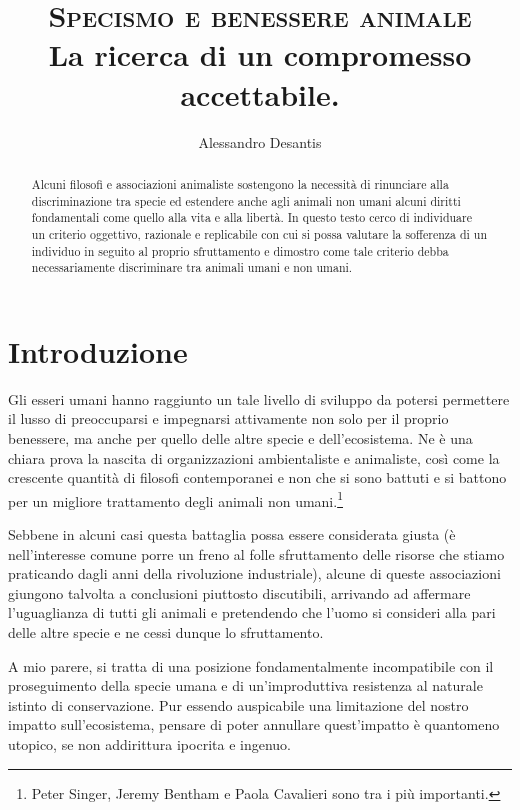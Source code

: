 \documentclass[a4paper,11pt,oneside,article]{memoir}
\title{\textsc{Specismo e benessere animale} \\ \vspace{1mm} \small{La ricerca di un compromesso accettabile.}}
\author{Alessandro Desantis}
\date{}
\begin{document}
\maketitle

\begin{abstract}

\noindent Alcuni filosofi e associazioni animaliste sostengono la necessità di
rinunciare alla discriminazione tra specie ed estendere anche agli animali non
umani alcuni diritti fondamentali come quello alla vita e alla libertà. In
questo testo cerco di individuare un criterio oggettivo, razionale e replicabile
con cui si possa valutare la sofferenza di un individuo in seguito al proprio
sfruttamento e dimostro come tale criterio debba necessariamente discriminare
tra animali umani e non umani.

\end{abstract}

\chapter{Introduzione}

Gli esseri umani hanno raggiunto un tale livello di sviluppo da potersi
permettere il lusso di preoccuparsi e impegnarsi attivamente non solo per il
proprio benessere, ma anche per quello delle altre specie e dell'ecosistema. Ne
è una chiara prova la nascita di organizzazioni ambientaliste e animaliste, così
come la crescente quantità di filosofi contemporanei e non che si sono battuti e
si battono per un migliore trattamento degli animali non umani.\footnote{Peter
Singer, Jeremy Bentham e Paola Cavalieri sono tra i più importanti.}

Sebbene in alcuni casi questa battaglia possa essere considerata giusta (è
nell'interesse comune porre un freno al folle sfruttamento delle risorse che
stiamo praticando dagli anni della rivoluzione industriale), alcune di queste
associazioni giungono talvolta a conclusioni piuttosto discutibili, arrivando ad
affermare l'uguaglianza di tutti gli animali e pretendendo che l'uomo si
consideri alla pari delle altre specie e ne cessi dunque lo sfruttamento.

A mio parere, si tratta di una posizione fondamentalmente incompatibile con il
proseguimento della specie umana e di un'improduttiva resistenza al naturale
istinto di conservazione. Pur essendo auspicabile una limitazione del nostro
impatto sull'ecosistema, pensare di poter annullare quest'impatto è quantomeno
utopico, se non addirittura ipocrita e ingenuo.
\end{document}

